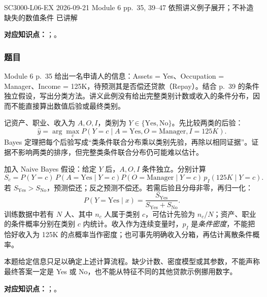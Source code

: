 
\examplemeta
  {SC3000-L06-EX}
  {2026-09-21}
  {Module 6 pp.~35, 39--47}
  {依照讲义例子展开；不补造缺失的数值条件}
  {已讲解}


\textbf{对应知识点：}；。

\subsubsection*{题目}

Module 6 p.~35 给出一名申请人的信息：Assets = Yes、Occupation = Manager、Income = 125K，待预测其是否偿还贷款（Repay）。结合 p.~39 的条件独立假设，写出分类方法。讲义此例没有给出完整类别计数或收入的条件分布，因而不能直接算出数值后验或最终类别。

\begin{workedsolution}
记资产、职业、收入为 $A,O,I$，类别为 $Y\in\{\mathrm{Yes},\mathrm{No}\}$。先比较两类的后验：
\[
  \hat y=\arg\max_cP(Y=c\mid A=\mathrm{Yes},O=\mathrm{Manager},I=125K).
\]
Bayes 定理把每个后验写成“类条件联合分布乘以类别先验，再除以相同证据”。证据不影响两类的排序，但完整类条件联合分布仍可能难以估计。

加入 Naive Bayes 假设：给定 $Y$ 后，$A,O,I$ 条件独立。分别计算
\[
  S_c=P(Y=c)\,P(A=\mathrm{Yes}\mid Y=c)
       P(O=\mathrm{Manager}\mid Y=c)\,p_I(125K\mid Y=c).
\]
若 $S_{\mathrm{Yes}}>S_{\mathrm{No}}$，预测偿还；反之预测不偿还。若需后验且分母非零，再归一化：
\[
  P(Y=\mathrm{Yes}\mid x)
  =\frac{S_{\mathrm{Yes}}}{S_{\mathrm{Yes}}+S_{\mathrm{No}}}.
\]
训练数据中若有 $N$ 人、其中 $n_c$ 人属于类别 $c$，可估计先验为 $n_c/N$；资产、职业的条件概率分别在类别 $c$ 内统计。收入作为连续变量时，$p_I$ 是\emph{条件密度}，不能把恰好收入为 125K 的点概率当作密度；也可事先明确收入分箱，再估计离散条件概率。

本题给定信息只足以确定上述计算流程。缺少计数、密度模型或其参数，不能声称最终答案一定是 Yes 或 No，也不能从特征不同的其他贷款示例挪用数字。
\end{workedsolution}


\textbf{对应知识点：}；。

